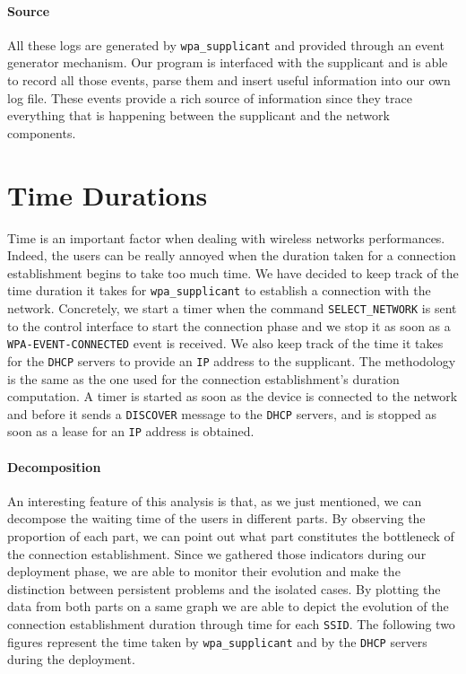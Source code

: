 \paragraph*{Source} All these logs are generated by \texttt{wpa\_supplicant} and provided through an event generator mechanism. Our program is interfaced with the supplicant and is able to record all those events, parse them and insert useful information into our own log file. These events provide a rich source of information since they trace everything that is happening between the supplicant and the network components.


\section{Time Durations}
Time is an important factor when dealing with wireless networks performances. Indeed, the users can be really annoyed when the duration taken for a connection establishment begins to take too much time. We have decided to keep track of the time duration it takes for \texttt{wpa\_supplicant} to establish a connection with the network. Concretely, we start a timer when the command \texttt{SELECT\_NETWORK} is sent to the control interface to start the connection phase and we stop it as soon as a \texttt{WPA-EVENT-CONNECTED} event is received. We also keep track of the time it takes for the \texttt{DHCP} servers to provide an \texttt{IP} address to the supplicant. The methodology is the same as the one used for the connection establishment's duration computation. A timer is started as soon as the device is connected to the network and before it sends a \texttt{DISCOVER} message to the \texttt{DHCP} servers, and is stopped as soon as a lease for an \texttt{IP} address is obtained. 

\paragraph*{Decomposition} An interesting feature of this analysis is that, as we just mentioned, we can decompose the waiting time of the users in different parts. By observing the proportion of each part, we can point out what part constitutes the bottleneck of the connection establishment. Since we gathered those indicators during our deployment phase, we are able to monitor their evolution and make the distinction between persistent problems and the isolated cases. By plotting the data from both parts on a same graph we are able to depict the evolution of the connection establishment duration through time for each \texttt{SSID}. The following two figures represent the time taken by \texttt{wpa\_supplicant} and by the \texttt{DHCP} servers during the deployment.

